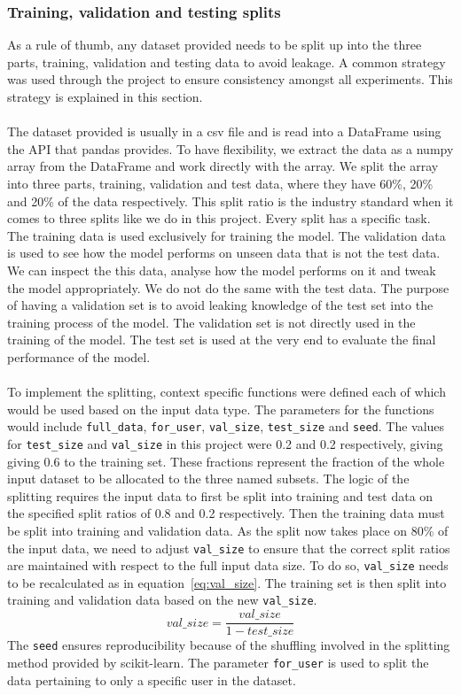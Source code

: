 \documentclass[12pt]{article}
\begin{document}
\subsubsection{Training, validation and testing splits}\label{subsubsec:split}
As a rule of thumb, any dataset provided needs to be split up into the three parts, training, validation and testing data to avoid leakage. A common strategy was used through the project to ensure consistency amongst all experiments. This strategy is explained in this section.
\\\\
The dataset provided is usually in a csv file and is read into a DataFrame using the API that pandas provides. To have flexibility, we extract the data as a numpy array from the DataFrame and work directly with the array. We split the array into three parts, training, validation and test data, where they have 60\%, 20\% and 20\% of the data respectively. This split ratio is the industry standard when it comes to three splits like we do in this project. Every split has a specific task. The training data is used exclusively for training the model. The validation data is used to see how the model performs on unseen data that is not the test data. We can inspect the this data, analyse how the model performs on it and tweak the model appropriately. We do not do the same with the test data. The purpose of having a validation set is to avoid leaking knowledge of the test set into the training process of the model. The validation set is not directly used in the training of the model. The test set is used at the very end to evaluate the final performance of the model.
\\\\
To implement the splitting, context specific functions were defined each of which would be used based on the input data type. The parameters for the functions would include \texttt{full\_data}, \texttt{for\_user}, \texttt{val\_size}, \texttt{test\_size} and \texttt{seed}. The values for \texttt{test\_size} and \texttt{val\_size} in this project were 0.2 and 0.2 respectively, giving giving 0.6 to the training set. These fractions represent the fraction of the whole input dataset to be allocated to the three named subsets. The logic of the splitting requires the input data to first be split into training and test data on the specified split ratios of 0.8 and 0.2 respectively. Then the training data must be split into training and validation data. As the split now takes place on 80\% of the input data, we need to adjust \texttt{val\_size} to ensure that the correct split ratios are maintained with respect to the full input data size. To do so, \texttt{val\_size} needs to be recalculated as in equation~\ref{eq:val_size}. The training set is then split into training and validation data based on the new \texttt{val\_size}.
\begin{equation}\label{eq:val_size}
	val\_size = \frac{val\_size}{1-test\_size}
\end{equation}
The \texttt{seed} ensures reproducibility because of the shuffling involved in the splitting method provided by scikit-learn. The parameter \texttt{for\_user} is used to split the data pertaining to only a specific user in the dataset.
\end{document}
